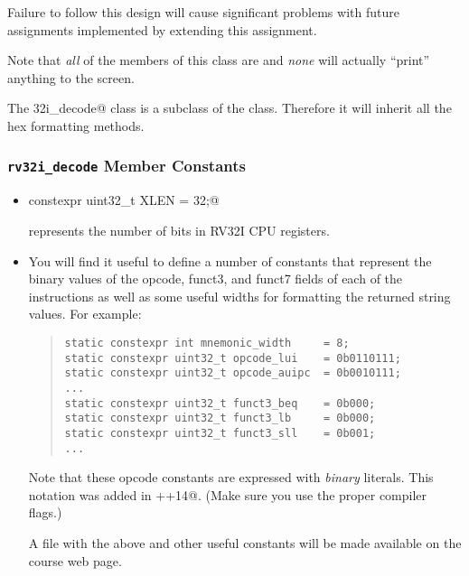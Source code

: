 \documentclass[11pt]{article}
\begin{document}
Failure to follow this design will cause significant problems with future 
assignments implemented by extending this assignment.

Note that {\em all} of the members of this class are \verb@static@ and 
{\em none} will actually ``print'' anything to the screen.

The \verb@rv32i_decode@ class is a subclass of the \verb@hex@ class.  
Therefore it will inherit all the hex formatting methods.



\subsubsection{{\tt rv32i\_decode} Member Constants}

\begin{itemize}

\item \verb@static constexpr uint32_t XLEN = 32;@

\verb@XLEN@ represents the number of bits in RV32I CPU registers.

\item You will find it useful to define a number of constants that 
represent the binary values of the opcode, funct3, and funct7 fields 
of each of the instructions as well as some useful widths for 
formatting the returned string values.  For example:

\begin{quote}
\small
\begin{verbatim}
static constexpr int mnemonic_width     = 8;
static constexpr uint32_t opcode_lui    = 0b0110111;
static constexpr uint32_t opcode_auipc  = 0b0010111;
...
static constexpr uint32_t funct3_beq    = 0b000;
static constexpr uint32_t funct3_lb     = 0b000;
static constexpr uint32_t funct3_sll    = 0b001;
...
\end{verbatim}
\end{quote}

Note that these opcode constants are expressed with {\em binary} literals.  
This notation was added in \verb@C++14@.  
(Make sure you use the proper compiler flags.)

A file with the above and other useful constants will be made available
on the course web page.
 
\end{itemize}






\end{document}
